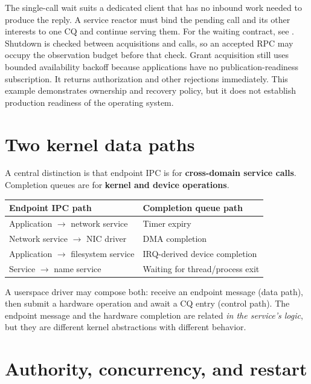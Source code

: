 The single-call wait suits a dedicated client that has no inbound work needed to
produce the reply. A service reactor must bind the pending call and its other
interests to one CQ and continue serving them. For the waiting contract, see
. Shutdown is checked between acquisitions
and calls, so an accepted RPC may occupy the observation budget before that check.
Grant acquisition still uses bounded availability backoff because applications
have no publication-readiness subscription. It returns authorization and other
rejections immediately. This example demonstrates ownership and recovery policy, but
it does not establish production readiness of the operating system.

\section{Two kernel data paths}

A central distinction is that endpoint IPC is for \textbf{cross-domain
service calls}. Completion queues are for \textbf{kernel and device operations}.

\begin{center}
\begin{tabular}{|l|l|}
\hline
\textbf{Endpoint IPC path} & \textbf{Completion queue path} \\
\hline
Application $\rightarrow$ network service & Timer expiry \\
Network service $\rightarrow$ NIC driver & DMA completion \\
Application $\rightarrow$ filesystem service & IRQ-derived device completion \\
Service $\rightarrow$ name service & Waiting for thread/process exit \\
\hline
\end{tabular}
\end{center}

A userspace driver may compose both: receive an endpoint message (data path), then
submit a hardware operation and await a CQ entry (control path). The endpoint
message and the hardware completion are related \emph{in the service's logic}, but
they are different kernel abstractions with different behavior.

\section{Authority, concurrency, and restart}

